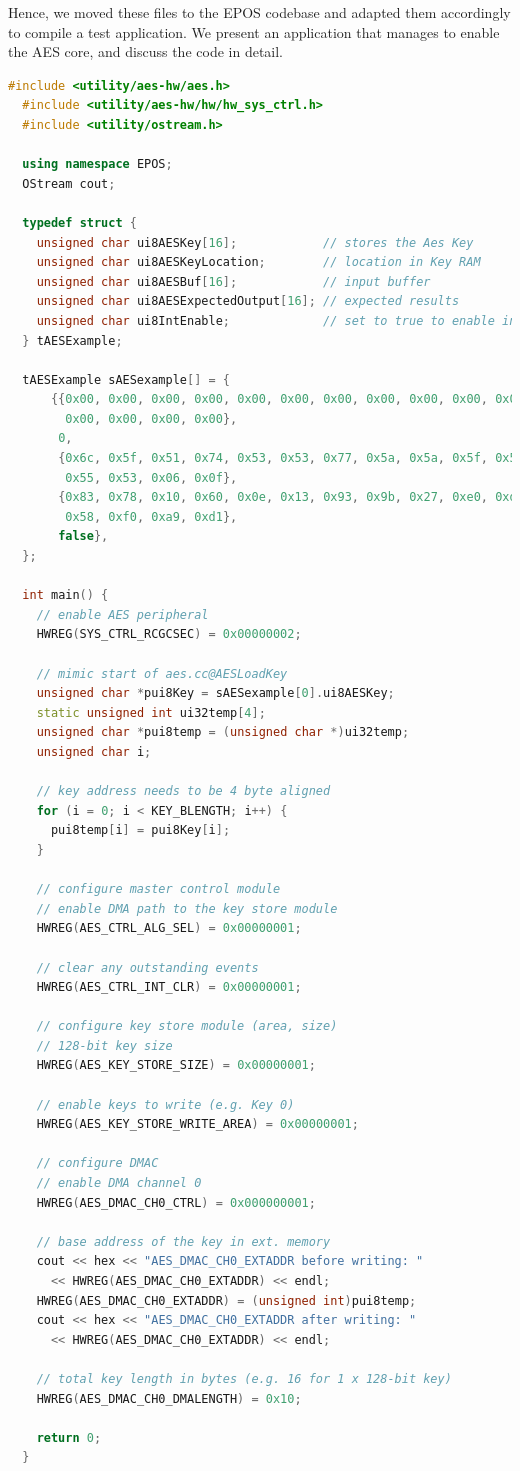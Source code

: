 \documentclass{../sftex/sftex}
\begin{document}
Hence, we moved these files to the EPOS codebase and adapted them
accordingly to compile a test application. We present an application that
manages to enable the AES core, and discuss the code in detail.

\begin{lstlisting}[language=C++,numbers=none]
  #include <utility/aes-hw/aes.h>
  #include <utility/aes-hw/hw/hw_sys_ctrl.h>
  #include <utility/ostream.h>

  using namespace EPOS;
  OStream cout;

  typedef struct {
    unsigned char ui8AESKey[16];            // stores the Aes Key
    unsigned char ui8AESKeyLocation;        // location in Key RAM
    unsigned char ui8AESBuf[16];            // input buffer
    unsigned char ui8AESExpectedOutput[16]; // expected results
    unsigned char ui8IntEnable;             // set to true to enable interrupts
  } tAESExample;

  tAESExample sAESexample[] = {
      {{0x00, 0x00, 0x00, 0x00, 0x00, 0x00, 0x00, 0x00, 0x00, 0x00, 0x00, 0x00,
        0x00, 0x00, 0x00, 0x00},
       0,
       {0x6c, 0x5f, 0x51, 0x74, 0x53, 0x53, 0x77, 0x5a, 0x5a, 0x5f, 0x57, 0x58,
        0x55, 0x53, 0x06, 0x0f},
       {0x83, 0x78, 0x10, 0x60, 0x0e, 0x13, 0x93, 0x9b, 0x27, 0xe0, 0xd7, 0xe4,
        0x58, 0xf0, 0xa9, 0xd1},
       false},
  };

  int main() {
    // enable AES peripheral
    HWREG(SYS_CTRL_RCGCSEC) = 0x00000002;

    // mimic start of aes.cc@AESLoadKey
    unsigned char *pui8Key = sAESexample[0].ui8AESKey;
    static unsigned int ui32temp[4];
    unsigned char *pui8temp = (unsigned char *)ui32temp;
    unsigned char i;

    // key address needs to be 4 byte aligned
    for (i = 0; i < KEY_BLENGTH; i++) {
      pui8temp[i] = pui8Key[i];
    }

    // configure master control module
    // enable DMA path to the key store module
    HWREG(AES_CTRL_ALG_SEL) = 0x00000001;

    // clear any outstanding events
    HWREG(AES_CTRL_INT_CLR) = 0x00000001;

    // configure key store module (area, size)
    // 128-bit key size
    HWREG(AES_KEY_STORE_SIZE) = 0x00000001;

    // enable keys to write (e.g. Key 0)
    HWREG(AES_KEY_STORE_WRITE_AREA) = 0x00000001;

    // configure DMAC
    // enable DMA channel 0
    HWREG(AES_DMAC_CH0_CTRL) = 0x000000001;

    // base address of the key in ext. memory
    cout << hex << "AES_DMAC_CH0_EXTADDR before writing: "
      << HWREG(AES_DMAC_CH0_EXTADDR) << endl;
    HWREG(AES_DMAC_CH0_EXTADDR) = (unsigned int)pui8temp;
    cout << hex << "AES_DMAC_CH0_EXTADDR after writing: "
      << HWREG(AES_DMAC_CH0_EXTADDR) << endl;

    // total key length in bytes (e.g. 16 for 1 x 128-bit key)
    HWREG(AES_DMAC_CH0_DMALENGTH) = 0x10;

    return 0;
  }
\end{lstlisting}
\end{document}
